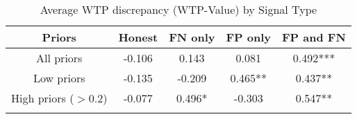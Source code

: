 \begin{table}[H]\centering \caption{Average WTP discrepancy (WTP-Value) by Signal Type} \label{tab:WTPnonpar} \begin{tabular}{ccccc} \hline \hline
\textbf{Priors}&\textbf{Honest}&\textbf{FN only}& \textbf{FP only} & \textbf{FP and FN}\\ \hline
All priors&-0.106&0.143&0.081&0.492***\\
Low priors&-0.135&-0.209&0.465**&0.437**\\
High priors ($>$0.2)&-0.077&0.496*&-0.303&0.547**\\
\hline \\ \end{tabular} \end{table}
